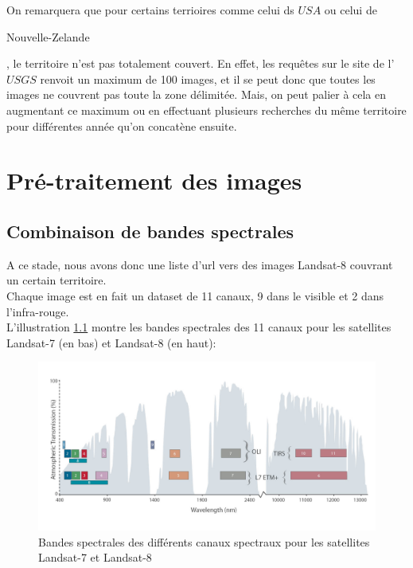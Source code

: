\documentclass{book}
\begin{document}
\clearpage

On remarquera que pour certains terrioires comme celui ds $USA$ ou celui de \begin{itshape}Nouvelle-Zelande\end{itshape}, 
le territoire n'est pas totalement couvert. En effet, les requ\^{e}tes sur le site de l'$USGS$ renvoit un maximum 
de 100 images, et il se peut donc que toutes les images ne couvrent pas toute la zone délimitée. 
Mais, on peut palier à cela en augmentant ce maximum 
ou en effectuant plusieurs recherches du même territoire pour différentes année qu'on concatène ensuite.\\

\chapter{Pré-traitement des images}
\section{Combinaison de bandes spectrales}

A ce stade, nous avons donc une liste d'url vers des images Landsat-8 couvrant un certain territoire.\\
Chaque image est en fait un dataset de 11 canaux, 9 dans le visible et 2 dans l'infra-rouge.\\
L'illustration \ref{lc8_bands} montre les bandes spectrales des 11 canaux pour les satellites 
Landsat-7 (en bas) et Landsat-8 (en haut):
\begin{figure}[H]
\begin{center}
\includegraphics[scale=0.2]{images/landsat8_bands.jpg}
\end{center}
\caption{Bandes spectrales des différents canaux spectraux pour les satellites Landsat-7 et Landsat-8 \cite{landsat8}}
\label{lc8_bands}
\end{figure}
\end{document}
